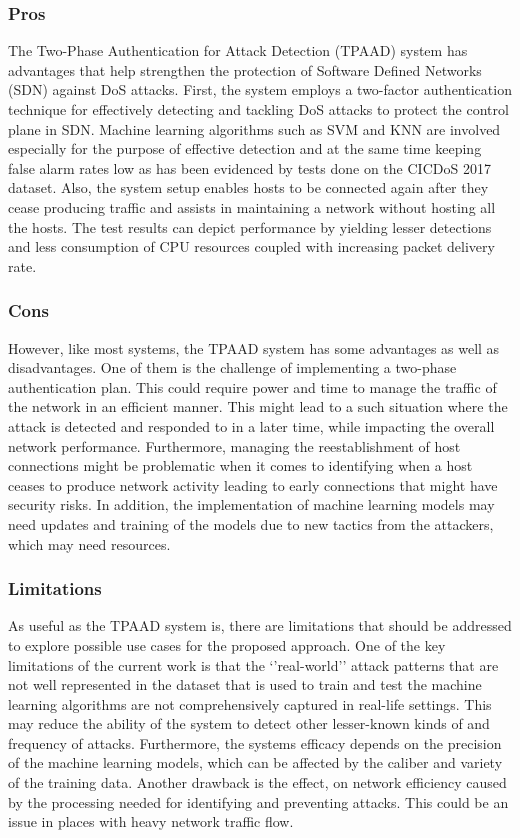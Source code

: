 \documentclass[a4paper, 12pt]{article}
\begin{document}
\subsubsection{Pros}
The Two-Phase Authentication for Attack Detection (TPAAD) system has advantages that help strengthen the protection of Software Defined Networks (SDN) against DoS attacks. First, the system employs a two-factor authentication technique for effectively detecting and tackling DoS attacks to protect the control plane in SDN. Machine learning algorithms such as SVM and KNN are involved especially for the purpose of effective detection and at the same time keeping false alarm rates low as has been evidenced by tests done on the CICDoS 2017 dataset. Also, the system setup enables hosts to be connected again after they cease producing traffic and assists in maintaining a network without hosting all the hosts. The test results can depict performance by yielding lesser detections and less consumption of CPU resources coupled with increasing packet delivery rate. 
\subsubsection{Cons}
However, like most systems, the TPAAD system has some advantages as well as disadvantages. One of them is the challenge of implementing a two-phase authentication plan. This could require power and time to manage the traffic of the network in an efficient manner. This might lead to a such situation where the attack is detected and responded to in a later time, while impacting the overall network performance. Furthermore, managing the reestablishment of host connections might be problematic when it comes to identifying when a host ceases to produce network activity leading to early connections that might have security risks. In addition, the implementation of machine learning models may need updates and training of the models due to new tactics from the attackers, which may need resources.
\subsubsection{Limitations}
As useful as the TPAAD system is, there are limitations that should be addressed to explore possible use cases for the proposed approach. One of the key limitations of the current work is that the ‘’real-world’’ attack patterns that are not well represented in the dataset that is used to train and test the machine learning algorithms are not comprehensively captured in real-life settings. This may reduce the ability of the system to detect other lesser-known kinds of and frequency of attacks. Furthermore, the systems efficacy depends on the precision of the machine learning models, which can be affected by the caliber and variety of the training data. Another drawback is the effect, on network efficiency caused by the processing needed for identifying and preventing attacks. This could be an issue in places with heavy network traffic flow.
\end{document}

